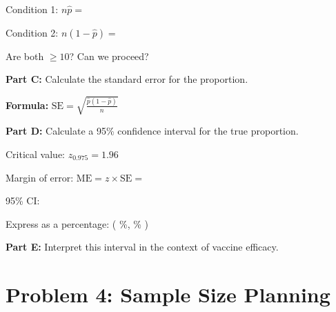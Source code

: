 \documentclass[11pt]{article}
\begin{document}
\vspace{0.3cm}

Condition 1: $n\hat{p} = $

\vspace{1cm}

Condition 2: $n(1-\hat{p}) = $

\vspace{1cm}

Are both $\geq 10$? \hspace{2cm} Can we proceed?

\vspace{1.5cm}

\textbf{Part C:} Calculate the standard error for the proportion.

\vspace{0.3cm}

\textbf{Formula:} $\text{SE} = \sqrt{\frac{\hat{p}(1-\hat{p})}{n}}$

\vspace{2.5cm}

\textbf{Part D:} Calculate a 95\% confidence interval for the true proportion.

\vspace{0.3cm}

Critical value: $z_{0.975} = 1.96$

\vspace{0.5cm}

Margin of error: $\text{ME} = z \times \text{SE} = $

\vspace{2cm}

95\% CI:

\vspace{2cm}

Express as a percentage: \hspace{2cm} ( \hspace{2cm} \%, \hspace{2cm} \% )

\vspace{1.5cm}

\textbf{Part E:} Interpret this interval in the context of vaccine efficacy.

\vspace{3cm}

\newpage

\section{Problem 4: Sample Size Planning}
\end{document}
